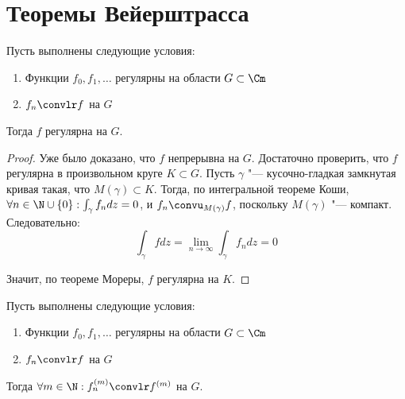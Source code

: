 \section{Теоремы Вейерштрасса}

\begin{theorem}
	Пусть выполнены следующие условия:
	\begin{enumerate}
		\item Функции $f_0, f_1, \dotsc$ регулярны на области $G \subset \Cm$
		\item $f_n \convlr f$ на $G$
	\end{enumerate}

\pagebreak
	
	Тогда $f$ регулярна на $G$.
\end{theorem}

\begin{proof}
	Уже было доказано, что $f$ непрерывна на $G$. Достаточно проверить, что $f$ регулярна в произвольном круге $K \subset G$. Пусть $\gamma$ "--- кусочно-гладкая замкнутая кривая такая, что $M(\gamma) \subset K$. Тогда, по интегральной теореме Коши, $\forall n \in \N \cup \{0\}: \int_\gamma f_ndz = 0$, и $f_n \convu_{M(\gamma)} f$, поскольку $M(\gamma)$ "--- компакт. Следовательно:
	\[\int_\gamma fdz = \lim_{n \to \infty}\int_\gamma f_ndz = 0\]
	
	Значит, по теореме Мореры, $f$ регулярна на $K$.
\end{proof}

\begin{theorem}
	Пусть выполнены следующие условия:
	\begin{enumerate}
		\item Функции $f_0, f_1, \dotsc$ регулярны на области $G \subset \Cm$
		\item $f_n \convlr f$ на $G$
	\end{enumerate}
	
	Тогда $\forall m \in \N: f_n^{(m)} \convlr f^{(m)}$ на $G$.
\end{theorem}
 
